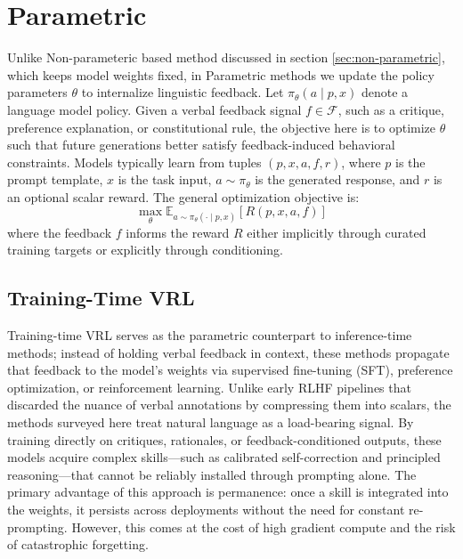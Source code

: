 \section{Parametric}

Unlike Non-parameteric based method discussed in section \ref{sec:non-parametric}, which keeps model weights fixed, in Parametric methods we update the policy parameters $\theta$ to internalize linguistic feedback.  Let $\pi_\theta(a \mid p, x)$ denote a language model policy. Given a verbal feedback signal $f \in \mathcal{F}$, such as a critique, preference explanation, or constitutional rule, the objective here is to optimize $\theta$ such that future generations better satisfy feedback-induced behavioral constraints. Models typically learn from tuples $(p, x, a, f, r)$, where $p$ is the prompt template, $x$ is the task input, $a \sim \pi_\theta$ is the generated response, and $r$ is an optional scalar reward. The general optimization objective is:
\begin{equation}
    \max_\theta \mathbb{E}_{a \sim \pi_\theta(\cdot \mid p, x)} \left[ R(p, x, a, f) \right]
\end{equation}
where the feedback $f$ informs the reward $R$ either implicitly through curated training targets or explicitly through conditioning.


\subsection{Training-Time VRL}
\label{sec:branchB}


Training-time VRL serves as the parametric counterpart to inference-time methods; instead of holding verbal feedback in context, these methods propagate that feedback to the model’s weights via supervised fine-tuning (SFT), preference optimization, or reinforcement learning. Unlike early RLHF pipelines that discarded the nuance of verbal annotations by compressing them into scalars, the methods surveyed here treat natural language as a load-bearing signal. By training directly on critiques, rationales, or feedback-conditioned outputs, these models acquire complex skills—such as calibrated self-correction and principled reasoning—that cannot be reliably installed through prompting alone. The primary advantage of this approach is permanence: once a skill is integrated into the weights, it persists across deployments without the need for constant re-prompting. However, this comes at the cost of high gradient compute and the risk of catastrophic forgetting.

